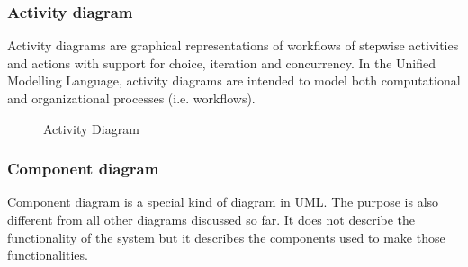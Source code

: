 \documentclass[12pt,a4paper]{report}
\begin{document}
\subsubsection{Activity diagram}
Activity diagrams are graphical representations of workflows of stepwise activities and actions with support for choice, iteration and concurrency. In the Unified Modelling Language, activity diagrams are intended to model both computational and organizational processes (i.e. workflows).\\

\begin{figure}[h]
	\begin{center}
		\caption{Activity Diagram}
	\end{center}
\end{figure}

\subsubsection{Component diagram}
Component diagram is a special kind of diagram in UML. The purpose is also different from all other diagrams discussed so far. It does not describe the functionality of the system but it describes the components used to make those functionalities.\\
\end{document}
